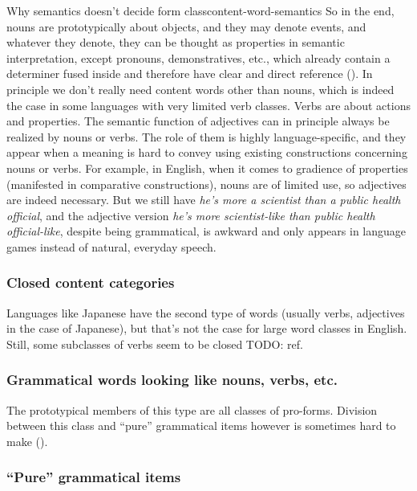 \documentclass[UTF8, a4paper, oneside, scheme=plain]{ctexrep}
\newcommand{\corpus}[1]{\emph{#1}}
\begin{document}
\begin{theorybox}{Why semantics doesn't decide form class}{content-word-semantics}
    So in the end,
    nouns are prototypically about objects,
    and they may denote events, 
    and whatever they denote, they can be thought as properties in semantic interpretation,
    except pronouns, demonstratives, etc., 
    which already contain a determiner fused inside 
    and therefore have clear and direct reference ().
    In principle we don't really need content words other than nouns,
    which is indeed the case in some languages
    with very limited verb classes.
    Verbs are about actions and properties.
    The semantic function of adjectives can in principle always be realized by nouns or verbs.
    The role of them is highly language-specific,
    and they appear when a meaning is hard to convey using existing constructions concerning nouns or verbs.
    For example, in English, when it comes to gradience of properties
    (manifested in comparative constructions),
    nouns are of limited use,
    so adjectives are indeed necessary.
    But we still have \corpus{he's more a scientist than a public health official},
    and the adjective version \corpus{he's more scientist-like than public health official-like},
    despite being grammatical, is awkward
    and only appears in language games instead of natural, everyday speech.
\end{theorybox}

\subsubsection{Closed content categories}

Languages like Japanese have the second type of words 
(usually verbs, adjectives in the case of Japanese),
but that's not the case for large word classes in English.
Still, some subclasses of verbs seem to be closed TODO: ref.

\subsubsection{Grammatical words looking like nouns, verbs, etc.}

The prototypical members of this type are all classes of pro-forms.
Division between this class and ``pure'' grammatical items however 
is sometimes hard to make (). %

\subsubsection{``Pure'' grammatical items}
\end{document}
